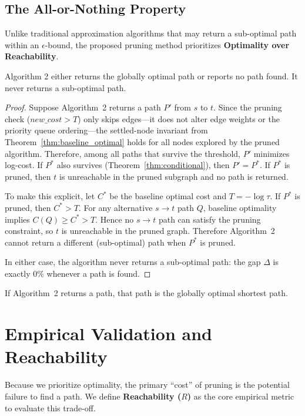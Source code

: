 \subsection{The All-or-Nothing Property}

Unlike traditional approximation algorithms that may return a sub-optimal path within an $\epsilon$-bound, the proposed pruning method prioritizes \textbf{Optimality over Reachability}.

\begin{theorem}\label{thm:all_or_nothing}
Algorithm 2 either returns the globally optimal path or reports no path found. It never returns a sub-optimal path.
\end{theorem}

\begin{proof}
Suppose Algorithm~2 returns a path $P'$ from $s$ to $t$. Since the pruning check ($\mathit{new\_cost} > T$) only skips edges---it does not alter edge weights or the priority queue ordering---the settled-node invariant from Theorem~\ref{thm:baseline_optimal} holds for all nodes explored by the pruned algorithm. Therefore, among all paths that survive the threshold, $P'$ minimizes log-cost. If $P^*$ also survives (Theorem~\ref{thm:conditional}), then $P' = P^*$. If $P^*$ is pruned, then $t$ is unreachable in the pruned subgraph and no path is returned.

To make this explicit, let $C^*$ be the baseline optimal cost and $T=-\log\tau$. If $P^*$ is pruned, then $C^*>T$. For any alternative $s\to t$ path $Q$, baseline optimality implies $C(Q)\ge C^*>T$. Hence no $s\to t$ path can satisfy the pruning constraint, so $t$ is unreachable in the pruned graph. Therefore Algorithm~2 cannot return a different (sub-optimal) path when $P^*$ is pruned.

In either case, the algorithm never returns a sub-optimal path: the gap $\Delta$ is exactly 0\% whenever a path is found.
\end{proof}

\begin{corollary}
If Algorithm~2 returns a path, that path is the globally optimal shortest path.
\end{corollary}

\section{Empirical Validation and Reachability}

Because we prioritize optimality, the primary ``cost'' of pruning is the potential failure to find a path. We define \textbf{Reachability ($R$)} as the core empirical metric to evaluate this trade-off.

